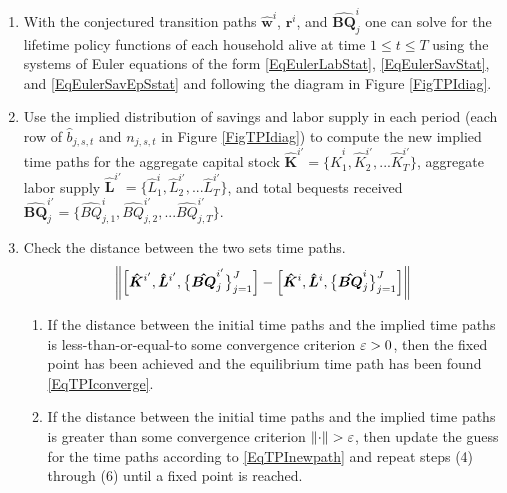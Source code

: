 \begin{enumerate}
\begin{enumerate}
      \end{enumerate}
    \item With the conjectured transition paths $\bm{\hat{w}}^i$, $\bm{r}^i$, and $\bm{\hat{BQ}}_j^i$ one can solve for the lifetime policy functions of each household alive at time $1\leq t\leq T$ using the systems of Euler equations of the form \eqref{EqEulerLabStat}, \eqref{EqEulerSavStat}, and \eqref{EqEulerSavEpSstat} and following the diagram in Figure \ref{FigTPIdiag}.
    \item Use the implied distribution of savings and labor supply in each period (each row of $\hat{b}_{j,s,t}$ and $n_{j,s,t}$ in Figure \ref{FigTPIdiag}) to compute the new implied time paths for the aggregate capital stock $\bm{\hat{K}}^{i'} = \{\hat{K}_1^i,\hat{K}_2^{i'},...\hat{K}_T^{i'}\}$, aggregate labor supply $\bm{\hat{L}}^{i'} = \{\hat{L}_1^i,\hat{L}_2^{i'},...\hat{L}_T^{i'}\}$, and total bequests received $\bm{\hat{BQ}}_j^{i'} = \{\hat{BQ}_{j,1}^i,\hat{BQ}_{j,2}^{i'},...\hat{BQ}_{j,T}^{i'}\}$.
    \item Check the distance between the two sets time paths.
      \begin{equation*}
        \left\lVert\Bigl[\bm{\hat{K}}^{i'}, \bm{\hat{L}}^{i'},\bigl\{\bm{\hat{BQ}}_j^{i'}\bigr\}_{j=1}^J\Bigr] - \Bigl[\bm{\hat{K}}^{i},\bm{\hat{L}}^{i},\bigl\{\bm{\hat{BQ}}_j^{i}\bigr\}_{j=1}^J\Bigr]\right\rVert
      \end{equation*}
      \begin{enumerate}
        \item If the distance between the initial time paths and the implied time paths is less-than-or-equal-to some convergence criterion $\varepsilon>0$, then the fixed point has been achieved and the equilibrium time path has been found \eqref{EqTPIconverge}.
        \item If the distance between the initial time paths and the implied time paths is greater than some convergence criterion $\left\lVert\cdot\right\rVert>\varepsilon$, then update the guess for the time paths according to \eqref{EqTPInewpath} and repeat steps (4) through (6) until a fixed point is reached.
      \end{enumerate}
  \end{enumerate}

